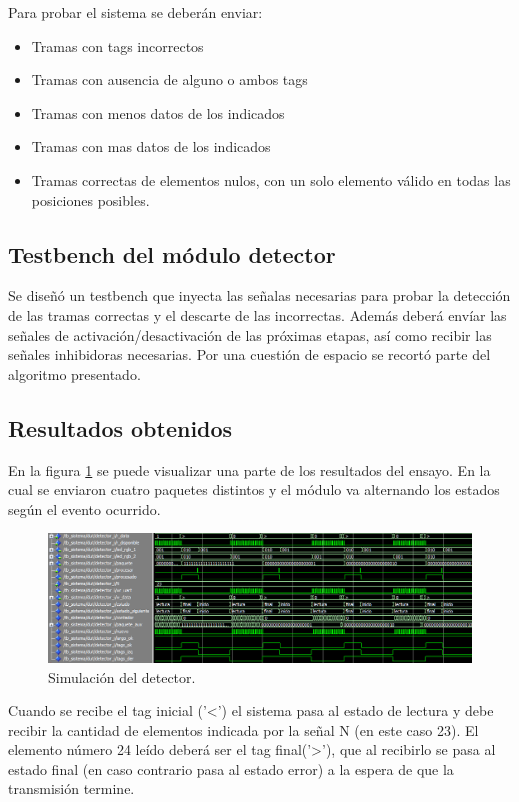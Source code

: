 	Para probar el sistema se deberán enviar:
	
	\begin{itemize}
		\item Tramas con tags incorrectos
		\item Tramas con ausencia de alguno o ambos tags
		\item Tramas con menos datos de los indicados
		\item Tramas con mas datos de los indicados
		\item Tramas correctas de elementos nulos, con un solo elemento válido en todas las posiciones posibles.
	\end{itemize}
	
	\subsection{Testbench del módulo detector}
			
		Se diseñó un testbench que inyecta las señalas necesarias para probar la detección de las tramas correctas y el descarte de las incorrectas. Además deberá envíar las señales de activación/desactivación de las próximas etapas, así como recibir las señales inhibidoras necesarias. Por una cuestión de espacio se recortó parte del algoritmo presentado.		
						
	\subsection{Resultados obtenidos}
				
		En la figura \ref{fig:Test_Detector} se puede visualizar una parte de los resultados del ensayo. En la cual se enviaron cuatro paquetes distintos y el módulo va alternando los estados según el evento ocurrido. 
		
		\begin{figure}[h]
		\centering
		\includegraphics[scale=0.5]{./Figures/Test/Detector}
			\caption{Simulación del detector.}
			\label{fig:Test_Detector}
		\end{figure}

		Cuando se recibe el tag inicial ('<') el sistema pasa al estado de lectura y debe recibir la cantidad de elementos indicada por la señal N (en este caso 23). El elemento número 24 leído deberá ser el tag final('>'), que al recibirlo se pasa al estado final (en caso contrario pasa al estado error) a la espera de que la transmisión termine.
		
